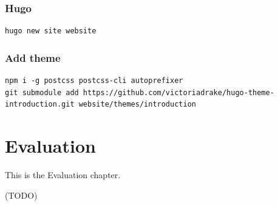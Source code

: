 \documentclass[a4paper]{report}
\begin{document}
\subsection{Hugo}
\begin{verbatim}
hugo new site website
\end{verbatim}

\subsection{Add theme}
\begin{verbatim}
npm i -g postcss postcss-cli autoprefixer
git submodule add https://github.com/victoriadrake/hugo-theme-introduction.git website/themes/introduction
\end{verbatim}

\chapter{Evaluation}

This is the Evaluation chapter.

(TODO)
\end{document}

